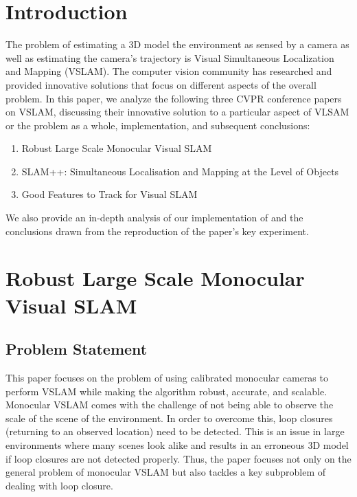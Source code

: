 \documentclass[10pt,twocolumn,letterpaper]{article}
\begin{document}
\section{Introduction}
The problem of estimating a 3D model the environment as sensed by a camera as well as estimating the 
camera's trajectory is Visual Simultaneous Localization and Mapping (VSLAM). The computer vision community has researched 
and provided innovative solutions that focus on different aspects of the overall problem. In this paper, we analyze the following three CVPR conference papers on VSLAM, discussing their innovative solution to a particular aspect of VLSAM or the problem as a whole, implementation, and subsequent conclusions: 
\begin{enumerate}
\item Robust Large Scale Monocular Visual SLAM \cite{Bourmaud_2015_CVPR}
\item SLAM++: Simultaneous Localisation and Mapping at the Level of Objects \cite{Salas-Moreno_2013_CVPR}
\item Good Features to Track for Visual SLAM \cite{Zhang_2015_CVPR} 
\end{enumerate}
We also provide an in-depth analysis of our implementation of \cite{Zhang_2015_CVPR} and the conclusions drawn from the reproduction of the paper's key experiment.

\section{Robust Large Scale Monocular Visual SLAM}
\subsection{Problem Statement}
This paper focuses on the problem of using calibrated monocular cameras to perform VSLAM 
while making the 
algorithm robust, accurate, and scalable. Monocular VSLAM comes with the challenge of not being able to 
observe the scale of the scene of the environment. In order to overcome this, loop closures (returning to an observed location) need to be
 detected. This is an issue in large environments where many scenes look alike and results in an erroneous 
3D model if loop closures are not detected properly. Thus, the paper focuses not only on the general 
problem of monocular VSLAM but also tackles 
a key subproblem of dealing with loop closure.
\end{document}
